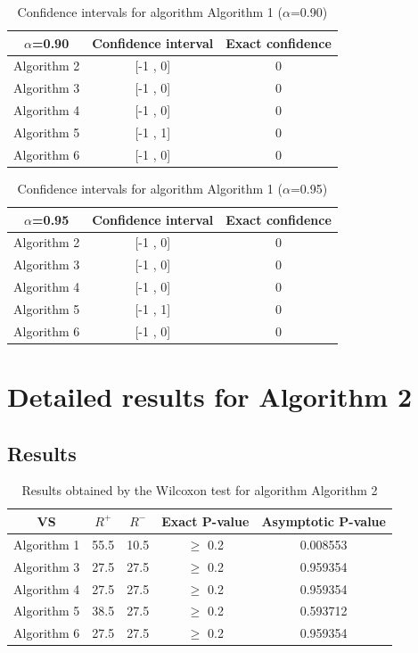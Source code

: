 \documentclass[a4paper,10pt]{article}
\begin{document}
\begin{table}[!htp]
\centering\small
\begin{tabular}{
|c|c|c|}
\hline
 $\alpha$=0.90 & Confidence interval & Exact confidence \\ \hline 
Algorithm 2 & [-1 , 0] & 0\\ \hline 
Algorithm 3 & [-1 , 0] & 0\\ \hline 
Algorithm 4 & [-1 , 0] & 0\\ \hline 
Algorithm 5 & [-1 , 1] & 0\\ \hline 
Algorithm 6 & [-1 , 0] & 0\\ \hline 

\end{tabular}
\caption{Confidence intervals for algorithm Algorithm 1 ($\alpha$=0.90)}
\end{table}
\begin{table}[!htp]
\centering\small
\begin{tabular}{
|c|c|c|}
\hline
 $\alpha$=0.95 & Confidence interval & Exact confidence \\ \hline 
Algorithm 2 & [-1 , 0] & 0\\ \hline 
Algorithm 3 & [-1 , 0] & 0\\ \hline 
Algorithm 4 & [-1 , 0] & 0\\ \hline 
Algorithm 5 & [-1 , 1] & 0\\ \hline 
Algorithm 6 & [-1 , 0] & 0\\ \hline 

\end{tabular}
\caption{Confidence intervals for algorithm Algorithm 1 ($\alpha$=0.95)}
\end{table}

 \clearpage 


\section{Detailed results for Algorithm 2}


\subsection{Results}

\begin{table}[!htp]
\centering\small
\begin{tabular}{
|c|c|c|c|c|}
\hline
 VS & $R^{+}$ & $R^{-}$ & Exact P-value & Asymptotic P-value \\ \hline 
Algorithm 1 & 55.5 & 10.5 & $\geq$ 0.2 & 0.008553\\ \hline 
Algorithm 3 & 27.5 & 27.5 & $\geq$ 0.2 & 0.959354\\ \hline 
Algorithm 4 & 27.5 & 27.5 & $\geq$ 0.2 & 0.959354\\ \hline 
Algorithm 5 & 38.5 & 27.5 & $\geq$ 0.2 & 0.593712\\ \hline 
Algorithm 6 & 27.5 & 27.5 & $\geq$ 0.2 & 0.959354\\ \hline 

\end{tabular}
\caption{Results obtained by the Wilcoxon test for algorithm Algorithm 2}
\end{table}
\end{document}
